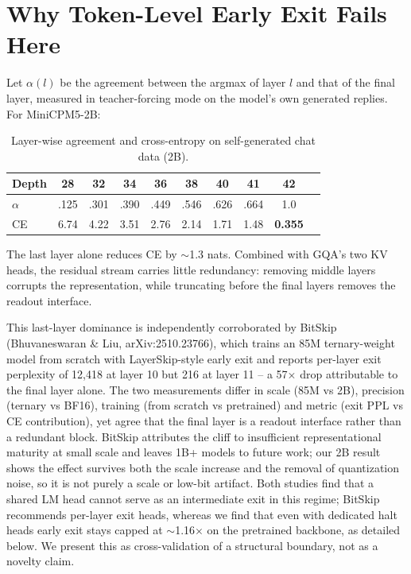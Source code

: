 \documentclass[11pt,a4paper]{article}
\begin{document}
\section{Why Token-Level Early Exit Fails Here}
Let $\alpha(l)$ be the agreement between the argmax of layer $l$ and that of the final layer,
measured in teacher-forcing mode on the model's own generated replies. For MiniCPM5-2B:
\begin{table}[h]
\centering
\begin{tabular}{lccccccccc}
\toprule
Depth & 28 & 32 & 34 & 36 & 38 & 40 & 41 & 42\\
\midrule
$\alpha$ & .125 & .301 & .390 & .449 & .546 & .626 & .664 & 1.0\\
CE & 6.74 & 4.22 & 3.51 & 2.76 & 2.14 & 1.71 & 1.48 & \textbf{0.355}\\
\bottomrule
\end{tabular}
\caption{Layer-wise agreement and cross-entropy on self-generated chat data (2B).}
\end{table}
The last layer alone reduces CE by $\sim$1.3 nats. Combined with GQA's two KV heads, the
residual stream carries little redundancy: removing middle layers corrupts the representation,
while truncating before the final layers removes the readout interface.

This last-layer dominance is independently corroborated by BitSkip (Bhuvaneswaran \& Liu,
arXiv:2510.23766), which trains an 85M ternary-weight model from scratch with LayerSkip-style
early exit and reports per-layer exit perplexity of 12,418 at layer 10 but 216 at layer 11 --
a 57$\times$ drop attributable to the final layer alone. The two measurements differ in scale
(85M vs 2B), precision (ternary vs BF16), training (from scratch vs pretrained) and metric
(exit PPL vs CE contribution), yet agree that the final layer is a readout interface rather
than a redundant block. BitSkip attributes the cliff to insufficient representational maturity
at small scale and leaves 1B+ models to future work; our 2B result shows the effect survives
both the scale increase and the removal of quantization noise, so it is not purely a scale or
low-bit artifact. Both studies find that a shared LM head cannot serve as an intermediate exit
in this regime; BitSkip recommends per-layer exit heads, whereas we find that even with
dedicated halt heads early exit stays capped at $\sim$1.16$\times$ on the pretrained backbone,
as detailed below. We present this as cross-validation of a structural boundary, not as a
novelty claim.
\end{document}
